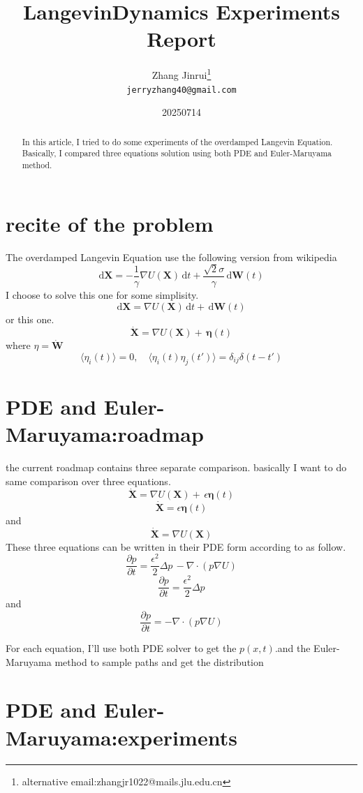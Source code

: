 \documentclass{article}
\title{LangevinDynamics Experiments Report}
\author{Zhang Jinrui\thanks{alternative email:zhangjr1022@mails.jlu.edu.cn} \\ \texttt{jerryzhang40@gmail.com}}
\date{20250714}  %
\theoremstyle{definition} %
\begin{document}
\maketitle

\begin{abstract}
    In this article, I tried to do some experiments
    of the overdamped Langevin Equation.
    Basically, I compared three equations solution
    using both PDE and Euler-Maruyama method.
\end{abstract}

\section{recite of the problem}
The overdamped Langevin Equation use the following
version from wikipedia
\cite[LangevinDynamics]{LangevinDynamics}
\[
    \mathrm{d}\mathbf{X} = -\frac{1}{\gamma} \nabla U(\mathbf{X}) \,\mathrm{d}t + \frac{\sqrt{2}\sigma}{\gamma} \,\mathrm{d}\mathbf{W}(t)
\]
I choose to solve this one for some simplisity.
\[
    \mathrm{d}\mathbf{X} = \nabla U(\mathbf{X}) \,\mathrm{d}t +  \,\mathrm{d}\mathbf{W}(t)
\]
or this one.
\[
    \dot{\mathbf{X}} =  \nabla U(\mathbf{X}) +  \,\boldsymbol{\eta}(t)
\]
where \(\eta=\dot{\mathbf{W}}\)
\[
    \langle \eta_i(t) \rangle = 0, \quad
    \langle \eta_i(t) \eta_j(t') \rangle = \delta_{ij} \delta(t - t')
\]

\section{PDE and Euler-Maruyama:roadmap}
the current roadmap contains three separate comparison.
basically I want to do same comparison over three
equations.
\[
    \dot{\mathbf{X}} =  \nabla U(\mathbf{X}) +  \,\epsilon\boldsymbol{\eta}(t)
\]
\[
    \dot{\mathbf{X}} =  \epsilon\boldsymbol{\eta}(t)
\]
and
\[
    \dot{\mathbf{X}} =  \nabla U(\mathbf{X})
\]
These three equations can be written in their
PDE form according to
\cite[Fokker-Planck Equation]{Fokker-Planck}
as follow.
\[
    \frac{\partial p}{\partial t} =  \frac{\epsilon^2}{2}  \Delta p\,-\nabla\cdot(p\nabla U)
\]
\[
    \frac{\partial p}{\partial t} = \frac{\epsilon^2}{2}  \Delta p
\]
and
\[
    \frac{\partial p}{\partial t} =  -\nabla\cdot(p\nabla U)
\]

For each equation, I'll use both PDE solver
to get the \(p(x,t)\).and the Euler-Maruyama method
to sample paths and get the distribution

\section{PDE and Euler-Maruyama:experiments}
\end{document}
